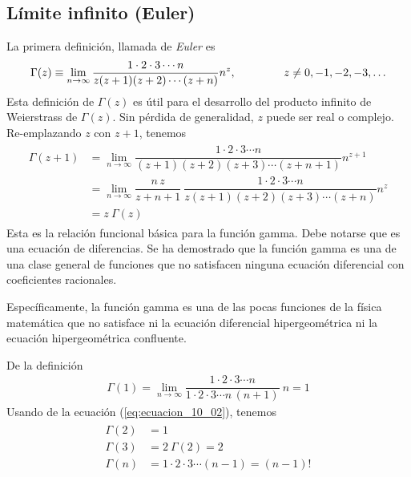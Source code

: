 \subsection{Límite infinito (Euler)}
La primera definición, llamada de \emph{Euler} es
\begin{equation}
\Gamma(z) \equiv \lim_{n \to \infty} \dfrac{1 \cdot 2 \cdot 3 \cdots n}{z (z+1) (z+2) \cdots (z+n)} n^{z}, \hspace{1.5cm} z \neq	0, -1,-2,-3, \ldots
\label{eq:ecuacion_10_01}
\end{equation}
Esta definición de $\Gamma(z)$ es útil para el desarrollo del producto infinito de Weierstrass de $\Gamma (z)$. Sin pérdida de generalidad, $z$ puede ser real o complejo. Re-emplazando $z$ con $z + 1$, tenemos
\begin{align}
\begin{aligned}
\Gamma (z + 1) &= \lim_{n \to \infty} \dfrac{1 \cdot 2 \cdot 3 \cdots n}{(z + 1)(z + 2)(z + 3) \cdots (z + n + 1)} n^{z + 1} \\
&= \lim_{n \to \infty} \dfrac{n \, z}{z + n + 1} \: \dfrac{1 \cdot 2 \cdot 3 \cdots n}{z (z + 1)(z + 2)(z + 3) \cdots (z + n)} n^{z} \\
&= z \: \Gamma (z)
\label{eq:ecuacion_10_02}
\end{aligned}
\end{align}
Esta es la relación funcional básica para la función gamma. Debe notarse que es una ecuación de diferencias. Se ha demostrado que la función gamma es una de una clase general de funciones que no satisfacen ninguna ecuación diferencial con coeficientes racionales.
\par
Específicamente, la función gamma es una de las pocas funciones de la física matemática que no satisface ni la ecuación diferencial hipergeométrica ni la ecuación hipergeométrica confluente.
\par
De la definición
\begin{align}
\Gamma (1) = \lim_{n \to \infty} \dfrac{1 \cdot 2 \cdot 3 \cdots n}{1 \cdot 2 \cdot 3 \cdots n \, (n + 1)} \: n = 1
\label{eq:ecuacion_10_03}
\end{align}
Usando de la ecuación (\ref{eq:ecuacion_10_02}), tenemos
\begin{align}
\begin{aligned}
\Gamma (2) &= 1 \\
\Gamma (3) &=  2 \: \Gamma(2) =  2 \\
\Gamma (n) &= 1 \cdot 2 \cdot 3 \cdots (n-1) =  (n-1)!
\label{eq:ecuacion_10_04}
\end{aligned}
\end{align}
